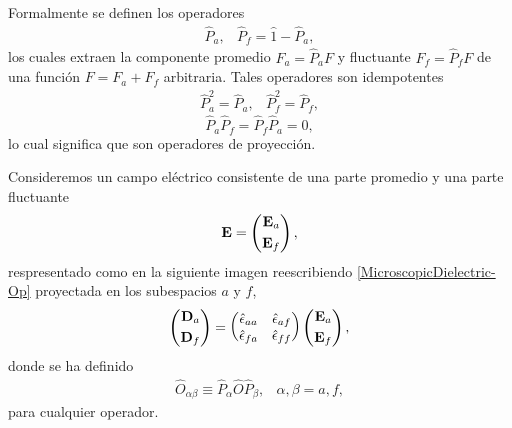 \documentclass[12pt]{article}
\begin{document}
Formalmente se definen los operadores 
\begin{equation}
  \begin{array}{cc}
    \label{operadoresPromedio-Fluctuaciones}
    \hat{P}_{a}, & \hat{P}_{f} = \hat{1} - \hat{P}_{a}, 
  \end{array}
\end{equation}
los cuales extraen la componente promedio $F_{a}=\hat{P}_{a}F$ y
fluctuante $F_{f}=\hat{P}_{f}F$ de una función $F = F_{a}+F_{f}$
arbitraria. Tales operadores son idempotentes
\begin{equation}
  \begin{array}{cc}
    \label{Op-Idempotentes}
    \hat{P}^{2}_{a}=\hat{P}_{a}, & \hat{P}^{2}_{f} =\hat{P}_{f},
  \end{array}
\end{equation}
\begin{equation}
  \hat{P}_{a}\hat{P}_{f}=\hat{P}_{f}\hat{P}_{a}=0,
\end{equation}
lo cual significa que son operadores de proyección.

Consideremos un campo eléctrico consistente de una parte promedio y
una parte fluctuante
\begin{equation}
  {\bf E} = \left(\begin{split} {\bf E}_{a} \\
    {\bf E}_{f} \end{split}\right),
\end{equation}
respresentado como en la siguiente imagen reescribiendo
\eqref{MicroscopicDielectric-Op} proyectada en los subespacios $a$ y
$f$,
\begin{equation}
  \label{CamposCompletos}
  \left(\begin{split} {\bf D}_{a} \\  {\bf D}_{f} \end{split}\right) =
  \left(\begin{matrix} \hat{\epsilon}_{aa} & \hat{\epsilon}_{af} \\
    \hat{\epsilon}_{fa} & \hat{\epsilon}_{ff} \end{matrix}\right)
  \left(\begin{split} {\bf E}_{a} \\ {\bf E}_{f} \end{split}\right),
\end{equation}
donde se ha definido
\begin{equation}
  \begin{array}{cc}
    \hat{O}_{\alpha \beta}\equiv \hat{P}_{\alpha}\hat{O}\hat{P}_{\beta}, & \alpha,\beta =a,f,
  \end{array}
\end{equation}
para cualquier operador.
\end{document}
